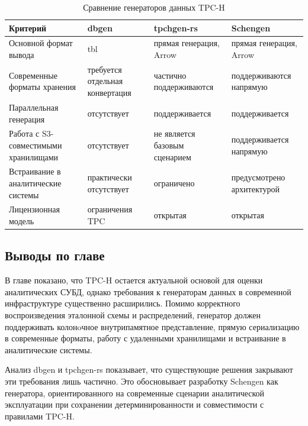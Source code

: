\begin{table}[h]
\caption{Сравнение генераторов данных TPC-H}
\label{tab:analogs}
\centering
\small
\begin{tabular}{|p{}|p{}|p{}|p{}|}
\hline
\textbf{Критерий} & \textbf{dbgen} & \textbf{tpchgen-rs} & \textbf{Schengen} \\
\hline
Основной формат вывода & tbl & прямая генерация, Arrow & прямая генерация, Arrow \\
\hline
Современные форматы хранения & требуется отдельная конвертация & частично поддерживаются & поддерживаются напрямую \\
\hline
Параллельная генерация & отсутствует & поддерживается & поддерживается \\
\hline
Работа с S3-совместимыми хранилищами & отсутствует & не является базовым сценарием & поддерживается напрямую \\
\hline
Встраивание в аналитические системы & практически отсутствует & ограничено & предусмотрено архитектурой \\
\hline
Лицензионная модель & ограничения TPC & открытая & открытая \\
\hline
\end{tabular}
\end{table}

\subsection*{Выводы по главе}

В главе показано, что TPC-H остается актуальной основой для оценки
аналитических СУБД, однако требования к генераторам данных в современной
инфраструктуре существенно расширились. Помимо корректного воспроизведения
эталонной схемы и распределений, генератор должен поддерживать колонoчное
внутрипамятное представление, прямую сериализацию в современные форматы,
работу с удаленными хранилищами и встраивание в аналитические системы.

Анализ dbgen и tpchgen-rs показывает, что существующие
решения закрывают эти требования лишь частично. Это обосновывает разработку
Schengen как генератора, ориентированного на современные сценарии
аналитической эксплуатации при сохранении детерминированности и совместимости с
правилами TPC-H.
